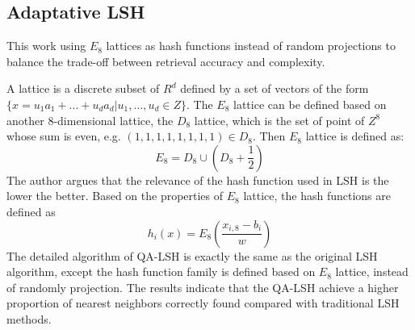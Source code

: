 \subsection{Adaptative LSH}
This work \cite{jegou2008query} using $E_8$ lattices as hash functions instead of random projections to balance the trade-off between retrieval accuracy and complexity.

A lattice is a discrete subset of $R^d$ defined by a set of vectors of the form $\{x=u_1a_1+...+u_da_d|u_1, ..., u_d\in Z\}$. The $E_8$ lattice can be defined based on another 8-dimensional lattice, the $D_8$ lattice, which is the set of point of $Z^8$ whose sum is even, e.g. $(1,1,1,1,1,1,1,1)\in D_8$. Then $E_8$ lattice is defined as:
$$E_8=D_8\cup (D_8+\frac{1}{2})$$
The author argues that the relevance of the hash function used in LSH is the lower the better. Based on the properties of $E_8$ lattice, the hash functions are defined as $$h_i(x)=E_8(\frac{x_{i,8}-b_i}{w})$$ The detailed algorithm of QA-LSH is exactly the same as the original LSH algorithm, except the hash function family is defined based on $E_8$ lattice, instead of randomly projection. The results indicate that the QA-LSH achieve a higher proportion of nearest neighbors correctly found compared with traditional LSH methods. 



